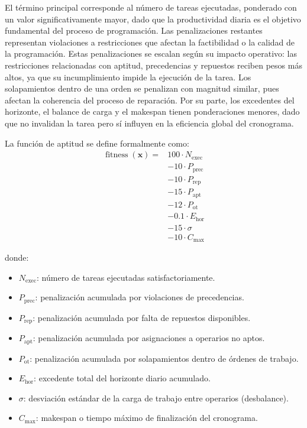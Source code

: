 El término principal corresponde al número de tareas ejecutadas, ponderado con un valor 
significativamente mayor, dado que la productividad diaria es el objetivo fundamental del 
proceso de programación. Las penalizaciones restantes representan violaciones a restricciones 
que afectan la factibilidad o la calidad de la programación. Estas penalizaciones se escalan 
según su impacto operativo: las restricciones relacionadas con aptitud, precedencias y 
repuestos reciben pesos más altos, ya que su incumplimiento impide la ejecución de la tarea. 
Los solapamientos dentro de una orden se penalizan con magnitud similar, pues afectan la 
coherencia del proceso de reparación. Por su parte, los excedentes del horizonte, el balance 
de carga y el makespan tienen ponderaciones menores, dado que no invalidan la tarea pero sí 
influyen en la eficiencia global del cronograma.

La función de aptitud se define formalmente como:
\[
\begin{aligned}
\operatorname{fitness}(\mathbf{x}) ={}&
100 \cdot N_{\text{exec}} \\
&- 10 \cdot P_{\text{prec}} \\
&- 10 \cdot P_{\text{rep}} \\
&- 15 \cdot P_{\text{apt}} \\
&- 12 \cdot P_{\text{ot}} \\
&- 0.1 \cdot E_{\text{hor}} \\
&- 15 \cdot \sigma \\
&- 10 \cdot C_{\max}
\end{aligned}
\]

donde:
\begin{itemize}
    \item $N_{\text{exec}}$: número de tareas ejecutadas satisfactoriamente.
    \item $P_{\text{prec}}$: penalización acumulada por violaciones de precedencias.
    \item $P_{\text{rep}}$: penalización acumulada por falta de repuestos disponibles.
    \item $P_{\text{apt}}$: penalización acumulada por asignaciones a operarios no aptos.
    \item $P_{\text{ot}}$: penalización acumulada por solapamientos dentro de órdenes de trabajo.
    \item $E_{\text{hor}}$: excedente total del horizonte diario acumulado.
    \item $\sigma$: desviación estándar de la carga de trabajo entre operarios (desbalance).
    \item $C_{\max}$: makespan o tiempo máximo de finalización del cronograma.
\end{itemize}

